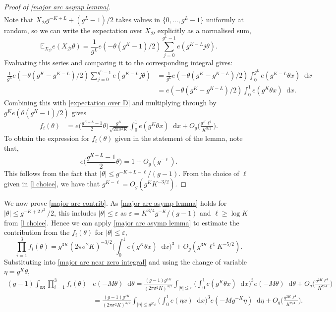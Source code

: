 \documentclass[hidelinks,11pt,reqno]{amsart}
\renewcommand{\leq}{\leqslant}
\renewcommand{\geq}{\geqslant}
\newcommand{\E}{\ensuremath{\mathbb{E}}}
\newcommand*\dif{\mathop{}\!\mathrm{d}}
\newcommand{\xbd}{X_{\mathcal{D}}}
\theoremstyle{remark}
\begin{document}
\begin{proof}[Proof of \cref{major arc asymp lemma}]
\begin{align}
    \end{align}
Note that $\xbd g^{-K+L}+(g^{L}-1)/2$ takes values in $\{0,\ldots, g^{L}-1\}$ uniformly at random, so we can write the expectation over $\xbd$ explicitly as a normalised sum,
\[\E_{\xbd}e(\xbd\theta)=\frac{1}{g^{L}}e(-\theta(g^{K}-1)/2)\sum_{j=0}^{g^{L}-1}e(g^{K-L}j\theta).\]
Evaluating this series and comparing it to the corresponding integral gives:
\begin{align*}
    \frac{1}{g^{L}}e(-\theta(g^{K}-g^{K-L})/2)\sum_{j=0}^{g^{L}-1}e(g^{K-L}j\theta)&=\frac{1}{g^{L}}e(-\theta(g^{K}-g^{K-L})/2)\int_{0}^{g^{L}}e(g^{K-L}\theta x)\dif x \\&=e(-\theta(g^{K}-g^{K-L})/2)\int_{0}^{1}e(g^{K}\theta x)\dif x.
\end{align*}
Combining this with \cref{expectation over D} and multiplying through by $g^{K}e(\theta(g^{K}-1)/2)$ gives
\begin{align*}
    f_{i}(\theta)&=e\Big ( \frac{g^{K-L}-1}{2}\theta\Big)\frac{g^{K}}{\sqrt{2\pi\sigma^{2}K}}\int_{0}^{1}e(g^{K}\theta x)\dif x+O_{g}\Big (\frac{g^{K}\ell^{4}}{K^{3/2}}\Big ).
\end{align*}
To obtain the expression for $f_{i}(\theta)$ given in the statement of the lemma, note that,
\[e\Big ( \frac{g^{K-L}-1}{2}\theta\Big)=1+O_{g}(g^{-\ell}).\]
This follows from the fact that $|\theta|\leq g^{-K+L-\ell}/(g-1)$. From the choice of $\ell$ given in \cref{l choice}, we have that $g^{K-\ell}=O_{g}(g^{K}K^{-3/2})$. 
\end{proof}
We now prove \cref{major arc contrib}. As \cref{major arc asymp lemma} holds for $|\theta|\leq g^{-K+2\ell^{2}}/2$, this includes $|\theta|\leq \varepsilon$ as $\varepsilon=K^{3/4}g^{-K}/(g-1)$ and $\ell \geq \log K$ from \cref{l choice}. Hence we can apply \cref{major arc asymp lemma} to estimate the contribution from the $f_{i}(\theta)$ for $|\theta|\leq \varepsilon$, 
\[\prod_{i=1}^{3}f_{i}(\theta)=g^{3K}(2\pi\sigma^{2}K)^{-3/2}\Big (\int_{0}^{1}e(g^{K}\theta x)\dif x\Big )^{3}+O_{g}(g^{3K}\ell^{4}K^{-5/2}).\]
Substituting into \cref{major arc near zero integral} and using the change of variable $\eta=g^{K}\theta$, 
\begin{align}
  (g-1)\int_{\mathfrak{M}}\prod_{i=1}^{3}f_{i}(\theta)&e(-M\theta)\dif \theta=\frac{(g-1)g^{3K}}{(2\pi\sigma^{2}K)^{3/2}}\int_{|\theta|\leq \varepsilon} \Big(\int_{0}^{1}e(g^{K}\theta x)\dif x\Big )^{3}e(-M\theta)\dif \theta+O_{g}\Big (\frac{g^{2K}\ell^{4}}{K^{7/4}}\Big )\nonumber\\
    &=\frac{(g-1)g^{2K}}{(2\pi\sigma^{2}K)^{3/2}}\int_{|\eta|\leq g^{K}\varepsilon}\Big (\int_{0}^{1}e(\eta x)\dif x \Big )^{3} e (-Mg^{-K}\eta )\dif \eta +O_{g}\Big (\frac{g^{2K}\ell^{4}}{K^{7/4}}\Big ).\label{major arc substitution}
\end{align}
\end{document}
